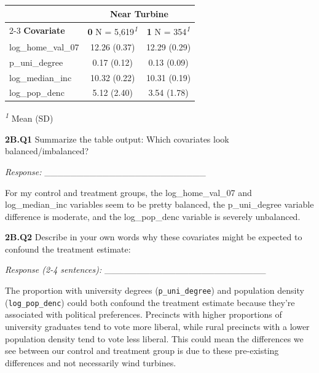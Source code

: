\documentclass[
  letterpaper,
  DIV=11,
  numbers=noendperiod]{scrartcl}
\begin{document}
\begin{table}
\fontsize{12.0pt}{14.0pt}\selectfont
\begin{tabular*}{\linewidth}{@{\extracolsep{\fill}}lcc}
\toprule
 & \multicolumn{2}{c}{\textbf{Near Turbine}} \\ 
\cmidrule(lr){2-3}
\textbf{Covariate} & \textbf{0}  N = 5,619\textsuperscript{\textit{1}} & \textbf{1}  N = 354\textsuperscript{\textit{1}} \\ 
\midrule\addlinespace[2.5pt]
log\_home\_val\_07 & 12.26 (0.37) & 12.29 (0.29) \\ 
p\_uni\_degree & 0.17 (0.12) & 0.13 (0.09) \\ 
log\_median\_inc & 10.32 (0.22) & 10.31 (0.19) \\ 
log\_pop\_denc & 5.12 (2.40) & 3.54 (1.78) \\ 
\bottomrule
\end{tabular*}
\begin{minipage}{\linewidth}
\vspace{.05em}
\textsuperscript{\textit{1}} Mean (SD)\\
\end{minipage}
\end{table}

\textbf{2B.Q1} Summarize the table output: Which covariates look
balanced/imbalanced?

\emph{Response:} \_\_\_\_\_\_\_\_\_\_\_\_\_\_\_\_\_\_\_\_\_\_\_\_\_

For my control and treatment groups, the log\_home\_val\_07 and
log\_median\_inc variables seem to be pretty balanced, the
p\_uni\_degree variable difference is moderate, and the log\_pop\_denc
variable is severely unbalanced.

\textbf{2B.Q2} Describe in your own words why these covariates might be
expected to confound the treatment estimate:

\emph{Response (2-4 sentences):}
\_\_\_\_\_\_\_\_\_\_\_\_\_\_\_\_\_\_\_\_\_\_\_\_\_

The proportion with university degrees (\texttt{p\_uni\_degree}) and
population density (\texttt{log\_pop\_denc}) could both confound the
treatment estimate because they're associated with political
preferences. Precincts with higher proportions of university graduates
tend to vote more liberal, while rural precincts with a lower population
density tend to vote less liberal. This could mean the differences we
see between our control and treatment group is due to these pre-existing
differences and not necessarily wind turbines.
\end{document}
